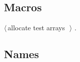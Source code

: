 \documentclass[12pt]{article}
\begin{document}
\subsection{Macros}
\label{sec:macros}



{\small\begin{list}{}{\setlength{\itemsep}{-\parsep}\setlength{\itemindent}{-\leftmargin}}
\item $\langle\,$allocate test arrays\nobreak\ {\footnotesize {}}$\,\rangle$ {\footnotesize {\NWtxtRefIn} .
}
\end{list}}



\subsection{Names}
\label{sec:names}












\end{document}
